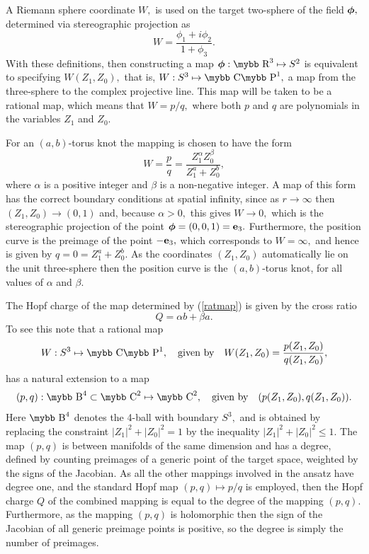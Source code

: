 \documentclass[12pt]{article}
\newcommand{\be}{\begin{equation}}
\newcommand{\ee}{\end{equation}}
\newcommand{\bphi}{\mbox{\boldmath $\phi$}}
\def\bb#1{\hbox{\mybb#1}}
\begin{document}
A Riemann sphere coordinate $W,$ is used on the target two-sphere of
the field $\bphi,$ determined via stereographic projection as \be
W=\frac{\phi_1+i\phi_2}{1+\phi_3}.\ee With these definitions, then
constructing a map $\bphi:\bb{R}^3\mapsto S^2$ is equivalent to
specifying $W(Z_1,Z_0),$ that is, $W:S^3\mapsto \bb{C}\bb{P}^1,$ a
map from the three-sphere to the complex projective line. This map
will be taken to be a rational map, which means that $W=p/q,$ where
both $p$ and $q$ are polynomials in the variables $Z_1$ and $Z_0.$

For an $(a,b)$-torus knot the mapping is chosen to have the form \be
W=\frac{p}{q}=\frac{Z_1^\alpha Z_0^\beta}{Z_1^a+Z_0^b},
\label{ratmap}\ee where $\alpha$ is a positive integer and $\beta$
is a non-negative integer. A map of this form has the correct
boundary conditions at spatial infinity, since as
$r\rightarrow\infty$ then $(Z_1,Z_0)\rightarrow(0,1)$ and, because
$\alpha>0,$ this gives $W\rightarrow 0,$ which is the stereographic
projection of the point $\bphi=(0,0,1)={\bf e}_3.$ Furthermore, the
position curve is the preimage of the point $-{\bf e}_3,$ which
corresponds to $W=\infty,$ and hence is given by $q=0=Z_1^a+Z_0^b.$
As the coordinates $(Z_1,Z_0)$ automatically lie on the unit
three-sphere then the position curve is the $(a,b)$-torus knot, for
all values of $\alpha$ and $\beta.$

The Hopf charge of the map determined by (\ref{ratmap}) is given by
the cross ratio \be Q=\alpha b+\beta a.\label{charge}\ee To see this
note that a rational map \be W:S^3\mapsto \bb{C}\bb{P}^1, \quad
\mbox{given\ by} \quad W(Z_1,Z_0)=\frac{p(Z_1,Z_0)}{q(Z_1,Z_0)},\ee
has a natural extension to a map \be (p,q):\bb{B}^4\subset
\bb{C}^2\mapsto \bb{C}^2, \quad \mbox{given\ by} \quad
(p(Z_1,Z_0),q(Z_1,Z_0)).\ee Here $\bb{B}^4$ denotes the 4-ball with
boundary  $S^3,$ and is obtained by replacing the constraint
$|Z_1|^2+|Z_0|^2=1$ by the inequality $|Z_1|^2+|Z_0|^2\le 1.$ The
map $(p,q)$ is between manifolds of the same dimension and 
has a degree, defined by counting preimages of a generic point of
the target space, weighted by the signs of the Jacobian. As all the
other mappings involved in the ansatz have degree one, and the
standard Hopf map $(p,q)\mapsto p/q$ is employed, then the Hopf
charge $Q$ of the combined mapping is equal to the degree of the
mapping $(p,q).$ Furthermore, as the mapping $(p,q)$ is holomorphic
then the sign of the Jacobian of all generic preimage points is
positive, so the degree is simply the number of preimages.
\end{document}
